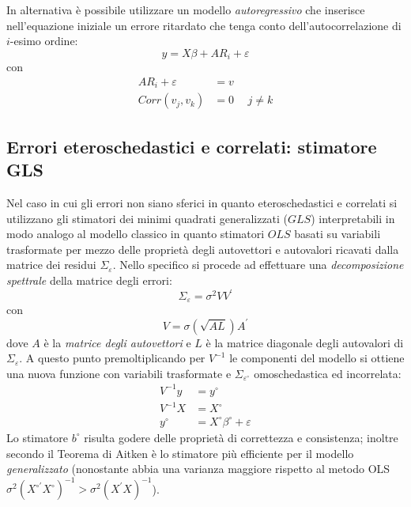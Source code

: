 \documentclass[a4page, 11pt]{article} %
\begin{document}
In alternativa è possibile utilizzare un modello \textit{autoregressivo} che inserisce nell’equazione iniziale un errore ritardato che tenga conto dell’autocorrelazione di $i$-esimo ordine:
\begin{equation*}
  y = X \beta + AR_i + \varepsilon
\end{equation*}
con 
\begin{align*}
  AR_i + \varepsilon &= v \\
  Corr(v_j,v_k) &= 0 \hspace{15pt} j \neq k
\end{align*}


\subsection*{Errori eteroschedastici e correlati: stimatore GLS}
Nel caso in cui gli errori non siano sferici in quanto eteroschedastici e correlati si utilizzano gli stimatori dei minimi quadrati generalizzati ($GLS$) interpretabili in modo analogo al modello classico in quanto stimatori $OLS$ basati su variabili trasformate per mezzo delle proprietà degli autovettori e autovalori ricavati dalla matrice dei residui $\Sigma_\varepsilon$.
Nello specifico si procede ad effettuare una \textit{decomposizione spettrale} della matrice degli errori:
\begin{equation*}
  \Sigma_\varepsilon = \sigma^2 V V^\prime
\end{equation*}
con
\begin{equation*}
V = \sigma (\sqrt{AL})A^\prime
\end{equation*}
dove $A$ è la \textit{matrice degli autovettori} e $L$ è la matrice diagonale degli autovalori di $\Sigma_\varepsilon$.
A questo punto premoltiplicando per $V^{-1}$ le componenti del modello si ottiene una nuova funzione con variabili trasformate e $\Sigma_{\varepsilon^\circ}$ omoschedastica ed incorrelata:
\begin{align*}
  V^{-1}y &= y^\circ \\
  V^{-1}X &= X^\circ \\
  y^\circ &= X^\circ \beta^\circ + \varepsilon
\end{align*}
Lo stimatore $b^\circ$ risulta godere delle proprietà di correttezza e consistenza; inoltre secondo il Teorema di Aitken è lo stimatore più efficiente per il modello \textit{generalizzato} (nonostante abbia una varianza maggiore rispetto al metodo OLS $\sigma^2 (X^{\circ \prime} X^\circ)^{-1} > \sigma^2 (X^\prime X)^{-1}$).
\end{document}
